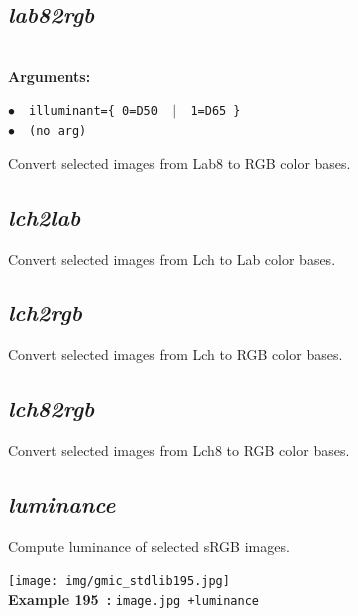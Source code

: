 \documentclass[a4paper,10.5pt,twoside]{book}
\newcommand{\Cb}[1]{\textcolor{cb}{#1}}
\begin{document}
\subsection{\emph{lab82rgb} }\vspace*{-0.7em}
~\\\textbf{\Cb{Arguments: }}\begin{flushleft}
{\small \Cb{\hspace*{0.5cm}$\bullet$~~\texttt{illuminant=\{ 0=D50 ~$|$~ 1=D65 \}}}}~~~\\
{\small \Cb{\hspace*{0.5cm}$\bullet$~~\texttt{(no arg)}}}\end{flushleft}
Convert selected images from Lab8 to RGB color bases.


\subsection{\emph{lch2lab} }\vspace*{-0.7em}
Convert selected images from Lch to Lab color bases.


\subsection{\emph{lch2rgb} }\vspace*{-0.7em}
Convert selected images from Lch to RGB color bases.


\subsection{\emph{lch82rgb} }\vspace*{-0.7em}
Convert selected images from Lch8 to RGB color bases.


\subsection{\emph{luminance} }\vspace*{-0.7em}
Compute luminance of selected sRGB images.
\begin{center}\texttt{[image: img/gmic\_stdlib195.jpg]}\\
{\footnotesize \textbf{Example 195~:} \texttt{image.jpg +luminance}}
\end{center}
\end{document}
